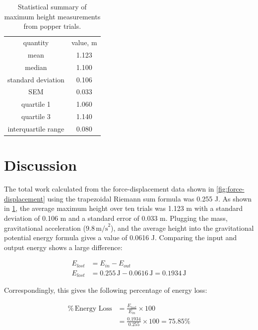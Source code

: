 \documentclass[amsmath,amssymb,aps,endfloats,linenumbers]{revtex4-2}
\begin{document}
\begin{table}
  \caption{Statistical summary of maximum height measurements from popper trials.}
  \label{tab:stats}
  \begin{center}
    \begin{ruledtabular}
      \begin{tabular}{cc}
        quantity & value, \unit{\meter} \\
        \colrule
        mean & \num{1.123} \\
        median & \num{1.100} \\
        standard deviation & \num{0.106} \\
        SEM & \num{0.033} \\
        quartile 1 & \num{1.060} \\
        quartile 3 & \num{1.140} \\
        interquartile range & \num{0.080} \\
      \end{tabular}
    \end{ruledtabular}
  \end{center}
\end{table}

\section{Discussion}
The total work calculated from the force-displacement data shown in \cref{fig:force-displacement} using the trapezoidal Riemann sum formula was 0.255 J. As shown in \cref{tab:stats}, the average maximum height over ten trials was 1.123 m with a standard deviation of 0.106 m and a standard error of 0.033 m. Plugging the mass, gravitational acceleration ($9.8\,\text{m/s}^2$), and the average height into the gravitational potential energy formula gives a value of 0.0616 J. Comparing the input and output energy shows a large difference:

\begin{equation}
\begin{aligned}
E_{lost} &= E_{in} - E_{out} \\
E_{lost} &= 0.255\,\text{J} - 0.0616\,\text{J} = 0.1934\,\text{J}
\end{aligned}
\end{equation}

Correspondingly, this gives the following percentage of energy loss:

\begin{equation}
\begin{aligned}
\%\,\text{Energy Loss} &= \frac{E_{lost}}{E_{in}} \times 100 \\
&= \frac{0.1934}{0.255} \times 100 = 75.85\%
\end{aligned}
\end{equation}
\end{document}
